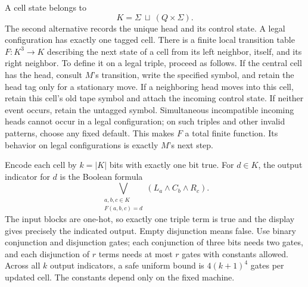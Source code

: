A cell state belongs to
\[
       K=\Sigma\ \sqcup\ (Q\times\Sigma).
\]
The second alternative records the unique head and its control state.
A legal configuration has exactly one tagged cell. There is a finite
local transition table $F:K^3\to K$ describing the next state of a cell
from its left neighbor, itself, and its right neighbor. To define it on a
legal triple, proceed as follows. If the central cell has the head,
consult $M$'s transition, write the specified symbol, and retain the head
tag only for a stationary move. If a neighboring head moves into this
cell, retain this cell's old tape symbol and attach the incoming control
state. If neither event occurs, retain the untagged symbol. Simultaneous
incompatible incoming heads cannot occur in a legal configuration;
on such triples and other invalid patterns, choose any fixed default.
This makes $F$ a total finite function. Its behavior on legal configurations
is exactly $M$'s next step.

Encode each cell by $k=|K|$ bits with exactly one bit true. For $d\in K$,
the output indicator for $d$ is the Boolean formula
\[
 \bigvee_{\substack{a,b,c\in K\\F(a,b,c)=d}}
                  (L_a\wedge C_b\wedge R_c).
\]
The input blocks are one-hot, so exactly one triple term is true and the
display gives precisely the indicated output. Empty disjunction means
false. Use binary conjunction and disjunction gates; each conjunction of
three bits needs two gates, and each disjunction of $r$ terms needs at
most $r$ gates with constants allowed. Across all $k$ output indicators,
a safe uniform bound is $4(k+1)^4$ gates per updated cell. The constants
depend only on the fixed machine.

